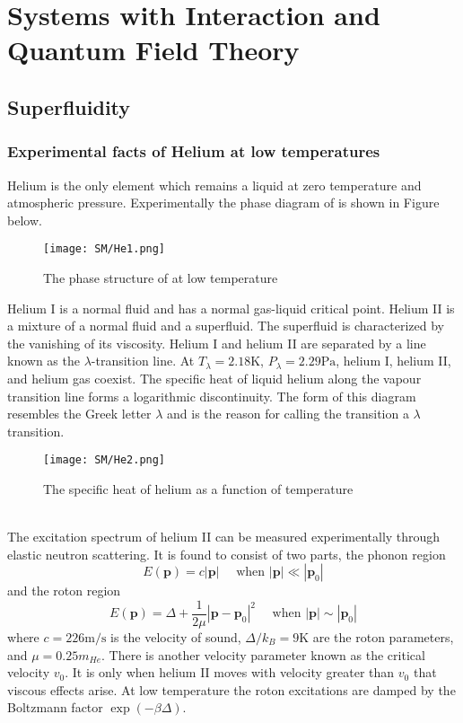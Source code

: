 \chapter{Systems with Interaction and Quantum Field Theory}
\section{Superfluidity}
\subsection{Experimental facts of Helium at low temperatures}
Helium is the only element which remains a liquid at zero temperature and atmospheric pressure.
Experimentally the phase diagram of  is shown in Figure below.
\begin{figure}[!h]
\centering
\texttt{[image: SM/He1.png]}
\caption{The phase structure of  at low temperature}
\end{figure}
Helium I is a normal fluid and has a normal gas-liquid critical point. Helium II is a mixture of a normal fluid and a superfluid. 
The superfluid is characterized by the vanishing of its viscosity. Helium I and helium II are separated by a line known as the $\lambda$-transition line.  At $T_{\lambda} = 2.18\mathrm{K}$, $P_{\lambda} = 2.29\mathrm{Pa}$, helium I, helium II, and helium gas coexist. 
The specific heat of liquid helium along the vapour transition line forms a logarithmic discontinuity. The form of this diagram resembles the Greek letter $\lambda$ and is the reason for calling the transition a $\lambda$ transition.
\begin{figure}[!h]
\centering
\texttt{[image: SM/He2.png]}
\caption{The specific heat of helium as a function of temperature}
\end{figure}
\\
The excitation spectrum of helium II can be measured experimentally through elastic neutron scattering. It is found to consist of two parts, the phonon region
\[E(\bm{p}) = c|\bm{p}| \quad \mbox{ when } |\bm{p}| \ll |\bm{p}_0|\]
and the roton region
\[E(\bm{p}) = \Delta + \frac{1}{2\mu} |\bm{p} - \bm{p}_0|^2 \quad \mbox{ when } |\bm{p}| \sim |\bm{p}_0|\]
where $c = 226 \mathrm{m/s}$ is the velocity of sound, $\Delta/k_B = 9\mathrm{K}$ are the roton parameters, and $\mu = 0.25m_{He}$. 
There is another velocity parameter known as the critical velocity $v_0$. It is only when helium II moves with velocity greater than $v_0$ that viscous effects arise. At low temperature the roton excitations are damped by the Boltzmann factor $\exp(-\beta \Delta)$.

